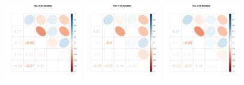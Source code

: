\begin{figure}[h]
\includegraphics[width=0.3\textwidth,height=0.18\textheight]{Chapters/05MCMCOU/plots/paraEvolution/corMatrix10.pdf}
\includegraphics[width=0.3\textwidth,height=0.18\textheight]{Chapters/05MCMCOU/plots/paraEvolution/corMatrix11.pdf}
\includegraphics[width=0.3\textwidth,height=0.18\textheight]{Chapters/05MCMCOU/plots/paraEvolution/corMatrix12.pdf}
\end{figure}

